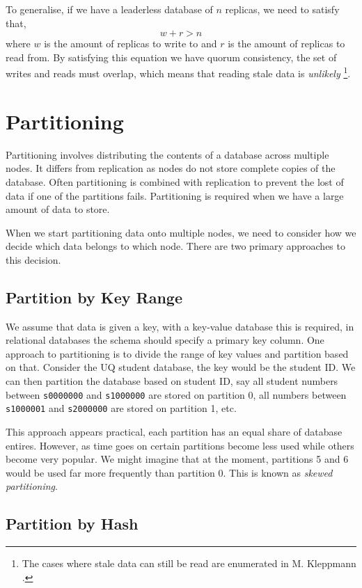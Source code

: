 To generalise, if we have a leaderless database of $n$ replicas,
we need to satisfy that,
$$
w + r > n
$$
where $w$ is the amount of replicas to write to and $r$ is the amount of replicas to read from.
By satisfying this equation we have quorum consistency,
the set of writes and reads must overlap,
which means that reading stale data is \textsl{unlikely}%
\footnote{The cases where stale data can still be read are enumerated in M. Kleppmann \cite{data-intensive}.}.

\section{Partitioning}

Partitioning involves distributing the contents of a database across multiple nodes.
It differs from replication as nodes do not store complete copies of the database.
Often partitioning is combined with replication to prevent the lost of data if one of the partitions fails.
Partitioning is required when we have a large amount of data to store.

When we start partitioning data onto multiple nodes,
we need to consider how we decide which data belongs to which node.
There are two primary approaches to this decision.

\subsection*{Partition by Key Range}
We assume that data is given a key,
with a key-value database this is required,
in relational databases the schema should specify a primary key column.
One approach to partitioning is to divide the range of key values and partition based on that.
Consider the UQ student database,
the key would be the student ID.
We can then partition the database based on student ID,
say all student numbers between \texttt{s0000000} and \texttt{s1000000} are stored on partition 0,
all numbers between \texttt{s1000001} and \texttt{s2000000} are stored on partition 1, etc.

This approach appears practical,
each partition has an equal share of database entires.
However, as time goes on certain partitions become less used while others become very popular.
We might imagine that at the moment,
partitions 5 and 6 would be used far more frequently than partition 0.
This is known as \textsl{skewed partitioning}.

\subsection*{Partition by Hash}


